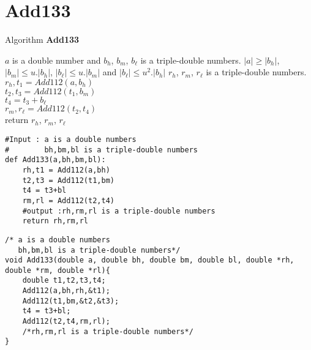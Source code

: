 \section*{Add133}
\begin{algorithm}[htbp]
  \caption{Algorithm \textbf{Add133}}
\begin{algorithmic}[1]
\Input $a$ is a double number and $b_h$, $b_m$, $b_{\ell}$ is a triple-double numbers.
\Condition $\lvert a \rvert \ge  \lvert b_h \rvert$, $\lvert b_m \rvert \le u. \lvert b_h \rvert$, $\lvert b_{\ell} \rvert \le u. \lvert b_m \rvert$ and $\lvert b_{\ell} \rvert \le u^2. \lvert b_h \rvert$
\Output $r_h$, $r_m$, $r_{\ell}$ is a triple-double numbers.
\State $r_h,t_1 = Add112(a,b_h)$\\
    $t_2,t_3 = Add112(t_1,b_m)$\\
    $t_4 = t_3+b_{\ell}$\\
    $r_m,r_{\ell} = Add112(t_2,t_4)$\\
    return $r_h$, $r_m$, $r_{\ell}$
\end{algorithmic}
\label{algo:Add133}
\end{algorithm}

\begin{lstlisting}
#Input : a is a double numbers
#        bh,bm,bl is a triple-double numbers
def Add133(a,bh,bm,bl):
    rh,t1 = Add112(a,bh)
    t2,t3 = Add112(t1,bm)
    t4 = t3+bl
    rm,rl = Add112(t2,t4)
    #output :rh,rm,rl is a triple-double numbers
    return rh,rm,rl
\end{lstlisting}

\begin{lstlisting}
/* a is a double numbers
   bh,bm,bl is a triple-double numbers*/
void Add133(double a, double bh, double bm, double bl, double *rh, double *rm, double *rl){
    double t1,t2,t3,t4;
    Add112(a,bh,rh,&t1); 
    Add112(t1,bm,&t2,&t3); 
    t4 = t3+bl;
    Add112(t2,t4,rm,rl);
    /*rh,rm,rl is a triple-double numbers*/
}

\end{lstlisting}
\newpage


